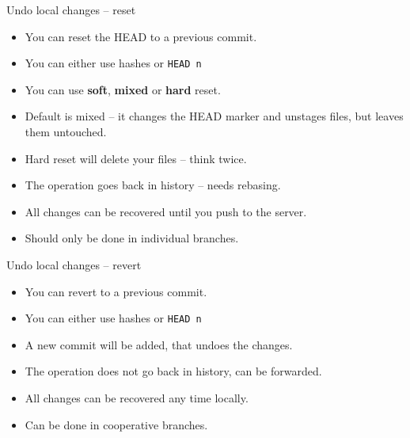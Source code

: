 \documentclass[14pt]{beamer}
\begin{document}
\begin{frame}{Undo local changes -- reset}
	\begin{itemize}
		\item You can reset the HEAD to a previous commit.
		\item You can either use hashes or \texttt{HEAD~n}
		\item You can use \textbf{soft}, \textbf{mixed} or \textbf{hard} reset.
		\item Default is mixed -- it changes the HEAD marker and unstages files, but leaves them untouched.
		\item Hard reset will delete your files -- think twice.
		\item The operation goes back in history -- needs rebasing.
		\item All changes can be recovered until you push to the server.
		\item Should only be done in individual branches.
	\end{itemize}
\end{frame}

\begin{frame}{Undo local changes -- revert}
	\begin{itemize}
		\item You can revert to a previous commit.
		\item You can either use hashes or \texttt{HEAD~n}
		\item A new commit will be added, that undoes the changes.
		\item The operation does not go back in history, can be forwarded.
		\item All changes can be recovered any time locally.
		\item Can be done in cooperative branches.
	\end{itemize}
\end{frame}
\end{document}
